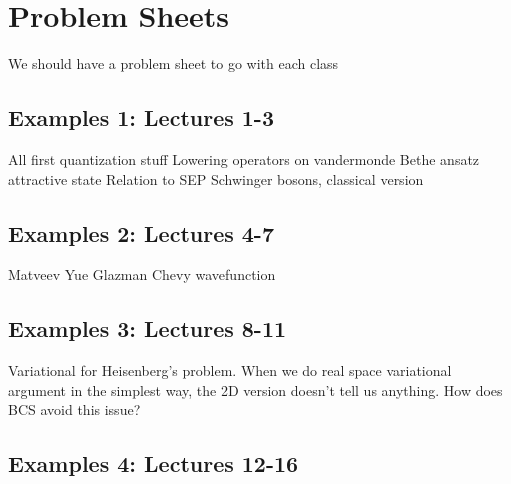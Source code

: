 \section{Problem Sheets}


We should have a problem sheet to go with each class

\subsection{Examples 1: Lectures 1-3}

All first quantization stuff
Lowering operators on vandermonde
Bethe ansatz attractive state
Relation to SEP
Schwinger bosons, classical version

\subsection{Examples 2: Lectures 4-7}

Matveev Yue Glazman
Chevy wavefunction

\subsection{Examples 3: Lectures 8-11}

Variational for Heisenberg's problem. When we do real space variational argument in the simplest way, the 2D version doesn't tell us anything. How does BCS avoid this issue?


\subsection{Examples 4: Lectures 12-16}



